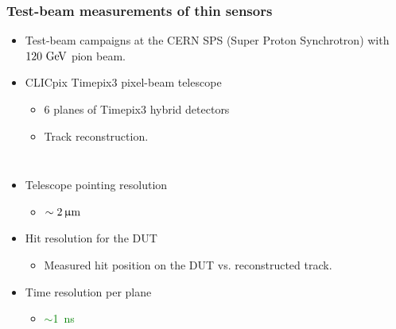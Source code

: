 \begin{frame}
  \frametitle{Test-beam measurements of thin sensors}

  \begin{itemize}
  \item Test-beam campaigns at the CERN SPS (Super Proton Synchrotron)
    with $120\,\mathrm{\,Ge\kern -0.1em V}$ pion beam.
  \item CLICpix Timepix3 pixel-beam telescope
    \begin{itemize}
    \item 6 planes of Timepix3 hybrid detectors
    \item Track reconstruction.
    \end{itemize}
  \end{itemize}


  \begin{columns}

    
    \begin{itemize}
    \item Telescope pointing resolution
      \begin{itemize}
      \item \textcolor{Green}{$\sim2\,\upmu\mathrm{m}$}
      \end{itemize}
    \item Hit resolution for the DUT
      \begin{itemize}
      \item Measured hit position on the DUT
        vs. reconstructed track.
      \end{itemize}
    \item Time resolution per plane
      \begin{itemize}
      \item \textcolor{Green}{$\sim$1~ns}
      \end{itemize}
    \end{itemize}


\end{columns}
\end{frame}
